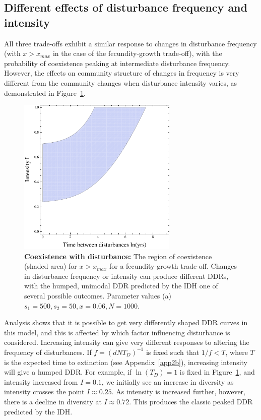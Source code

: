 \documentclass[a4paper]{article}
\begin{document}
\subsection{Different effects of disturbance frequency and intensity}
All three trade-offs exhibit a similar response to changes in disturbance frequency (with $x>x_{max}$ in the case of the fecundity-growth trade-off), with the probability of coexistence peaking at intermediate disturbance frequency. However, the effects on community structure of changes in frequency is very different from the community changes when disturbance intensity varies, as demonstrated in Figure~\ref{fig:hockey}. 
\begin{figure}[th]
\centering
  \includegraphics[width=3in]{hockeyTd.pdf}
   \caption{\textbf{Coexistence with disturbance: }The region of coexistence (shaded area) for $x>x_{max}$ for a fecundity-growth trade-off. Changes in disturbance frequency or intensity can produce different DDRs, with the humped, unimodal DDR predicted by the IDH one of several possible outcomes. Parameter values (a) $s_1=500, s_2=50, x=0.06,N=1000$.}
 \label{fig:hockey}
\end{figure}

Analysis shows that it is possible to get very differently shaped DDR curves in this model, and this is affected by which factor influencing disturbance is considered. Increasing intensity can give very different responses to altering the frequency of disturbances. If $f=(dNT_D)^{-1}$ is fixed such that $1/f<T$, where $T$ is the expected time to extinction (see Appendix~\ref{app2b}), increasing intensity will give a humped DDR. For example, if $\ln(T_D)=1$ is fixed in Figure~\ref{fig:hockey}, and intensity increased from $I=0.1$, we initially see an increase in diversity as intensity crosses the point $I\approx0.25$. As intensity is increased further, however, there is a decline in diversity at $I\approx0.72$. This produces the classic peaked DDR predicted by the IDH.
\end{document}
